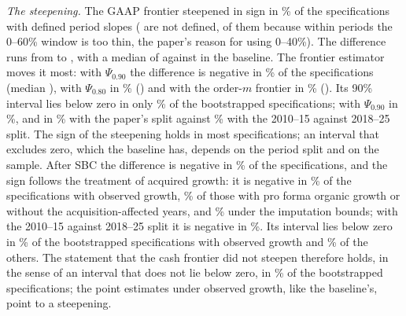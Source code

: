 \emph{The steepening.} The GAAP frontier steepened in sign in \ScDiffOpShare\% of the \ScDiffOpN{} specifications with defined period slopes (\ScDiffOpInv{} are not defined, \ScDiffOpInvWindow{} of them because within periods the 0--60\% window is too thin, the paper's reason for using 0--40\%). The difference runs from \ScDiffOpMin{} to \ScDiffOpMax, with a median of \ScDiffOpMed{} against \ScDiffOpBase{} in the baseline. The frontier estimator moves it most: with $\Psi_{0.90}$ the difference is negative in \ScDiffOpNinetyShare\% of the specifications (median \ScDiffOpNinetyMed), with $\Psi_{0.80}$ in \ScDiffOpEightyShare\% (\ScDiffOpEightyMed) and with the order-$m$ frontier in \ScDiffOpOrderMShare\% (\ScDiffOpOrderMMed). Its 90\% interval lies below zero in only \ScDiffOpBootShare\% of the bootstrapped specifications; with $\Psi_{0.90}$ in \ScDiffOpBootNinetyShare\%, and in \ScDiffOpBootNinetySplitAShare\% with the paper's split against \ScDiffOpBootNinetySplitBShare\% with the 2010--15 against 2018--25 split. The sign of the steepening holds in most specifications; an interval that excludes zero, which the baseline has, depends on the period split and on the sample. After SBC the difference is negative in \ScDiffCashShareNeg\% of the specifications, and the sign follows the treatment of acquired growth: it is negative in \ScDiffCashNegObs\% of the specifications with observed growth, \ScDiffCashNegOrg\% of those with pro forma organic growth or without the acquisition-affected years, and \ScDiffCashNegImp\% under the imputation bounds; with the 2010--15 against 2018--25 split it is negative in \ScDiffCashNegSplitB\%. Its interval lies below zero in \ScDiffCashBootNegObs\% of the bootstrapped specifications with observed growth and \ScDiffCashBootNegOther\% of the others. The statement that the cash frontier did not steepen therefore holds, in the sense of an interval that does not lie below zero, in \ScDiffCashBootShare\% of the bootstrapped specifications; the point estimates under observed growth, like the baseline's, point to a steepening.

